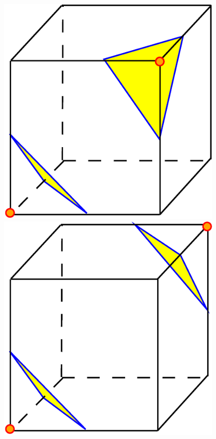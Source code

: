 \begin{figure}[ht]
\includegraphics[scale=0.15]{../img/mar_cub_case3.eps}
\includegraphics[scale=0.15]{../img/mar_cub_case4.eps}

\end{figure}
